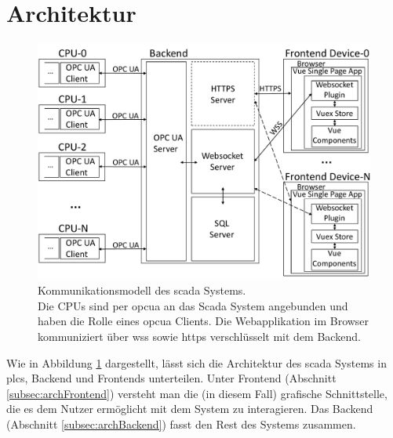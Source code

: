 \section{Architektur}

\begin{figure}[ht]
		\centering
		\includegraphics[width=\textwidth]{content/hauptteil/systemEntwurf/res/comMod.pdf}
    \caption[Kommunikationsmodell des \acs{scada} Systems]{Kommunikationsmodell des \acs{scada} Systems.\\
      Die CPUs sind per \acs{opcua} an das Scada System angebunden und haben die Rolle eines \acs{opcua} Clients.
      Die Webapplikation im Browser kommuniziert über \acs{wss} sowie \acs{https} verschlüsselt mit dem Backend.}
		\label{img:comMod}
\end{figure}
Wie in Abbildung \ref{img:comMod} dargestellt, lässt sich die Architektur des \ac{scada} Systems in \acp{plc}, Backend und Frontends unterteilen.
Unter Frontend (Abschnitt \ref{subsec:archFrontend}) versteht man die (in diesem Fall) grafische Schnittstelle, 
die es dem Nutzer ermöglicht mit dem System zu interagieren.
Das Backend (Abschnitt \ref{subsec:archBackend}) fasst den Rest des Systems zusammen.

